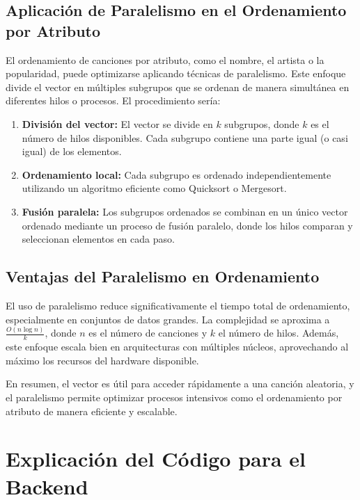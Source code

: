 \documentclass[corference]{IEEEtran}
\begin{document}
\begin{flushleft}
        \subsection{Aplicación de Paralelismo en el Ordenamiento por Atributo}
            \noindent\hspace*{4em}El ordenamiento de canciones por atributo, como el nombre, el artista o la popularidad, puede optimizarse aplicando técnicas de paralelismo. Este enfoque divide el vector en múltiples subgrupos que se ordenan de manera simultánea en diferentes hilos o procesos. El procedimiento sería:
            \begin{enumerate}
                \item \textbf{División del vector:} El vector se divide en \(k\) subgrupos, donde \(k\) es el número de hilos disponibles. Cada subgrupo contiene una parte igual (o casi igual) de los elementos.
                \item \textbf{Ordenamiento local:} Cada subgrupo es ordenado independientemente utilizando un algoritmo eficiente como Quicksort o Mergesort.
                \item \textbf{Fusión paralela:} Los subgrupos ordenados se combinan en un único vector ordenado mediante un proceso de fusión paralelo, donde los hilos comparan y seleccionan elementos en cada paso.
            \end{enumerate}
        
        \subsection{Ventajas del Paralelismo en Ordenamiento}
            \noindent\hspace*{4em}El uso de paralelismo reduce significativamente el tiempo total de ordenamiento, especialmente en conjuntos de datos grandes. La complejidad se aproxima a \(\frac{O(n \log n)}{k}\), donde \(n\) es el número de canciones y \(k\) el número de hilos. Además, este enfoque escala bien en arquitecturas con múltiples núcleos, aprovechando al máximo los recursos del hardware disponible.
            
            \noindent\hspace*{4em}En resumen, el vector es útil para acceder rápidamente a una canción aleatoria, y el paralelismo permite optimizar procesos intensivos como el ordenamiento por atributo de manera eficiente y escalable.
    
        \section{Explicación del Código para el Backend}

\end{flushleft}
\end{document}
